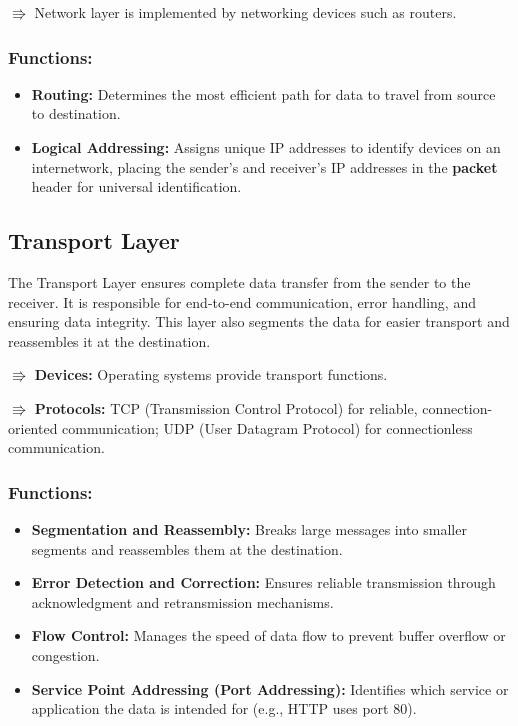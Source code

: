 $\Rrightarrow$ Network layer is implemented by networking devices such as routers.

\subsubsection{Functions:}
\begin{itemize}
   \item \textbf{Routing:} Determines the most efficient path for data to travel from source to destination.
   \item \textbf{Logical Addressing:} Assigns unique IP addresses to identify devices on an internetwork, placing the sender's and receiver's IP addresses in the \textbf{packet} header for universal identification.
\end{itemize}



\vspace{1em}
\subsection{Transport Layer}
The Transport Layer ensures complete data transfer from the sender to the receiver. It is responsible for end-to-end communication, error handling, and ensuring data integrity. This layer also segments the data for easier transport and reassembles it at the destination.

$\Rrightarrow$ \textbf{Devices:} Operating systems provide transport functions.

$\Rrightarrow$ \textbf{Protocols:} TCP (Transmission Control Protocol) for reliable, connection-oriented communication; UDP (User Datagram Protocol) for connectionless communication.

\subsubsection{Functions:}
\begin{itemize}
   \item \textbf{Segmentation and Reassembly:}
   Breaks large messages into smaller segments and reassembles them at the destination.
   \item \textbf{Error Detection and Correction:}
   Ensures reliable transmission through acknowledgment and retransmission mechanisms.
   \item \textbf{Flow Control:}
   Manages the speed of data flow to prevent buffer overflow or congestion.
   \item \textbf{Service Point Addressing (Port Addressing):}
   Identifies which service or application the data is intended for (e.g., HTTP uses port 80).
\end{itemize}



